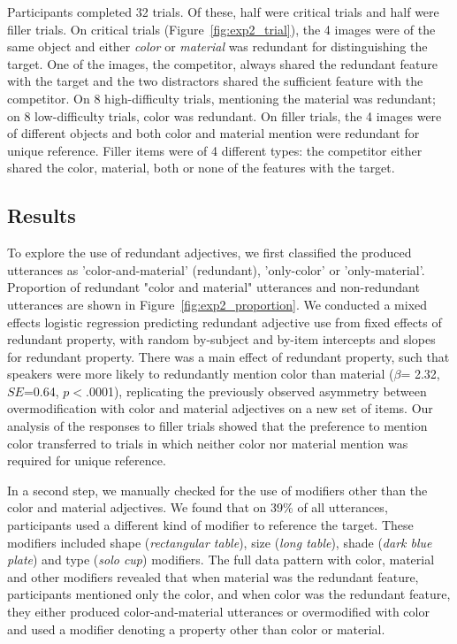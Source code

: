 \documentclass[12pt,letterpaper]{article}
\begin{document}
Participants completed 32 trials. Of these, half were critical trials and half were filler trials. On critical trials (Figure~\ref{fig:exp2_trial}), the 4 images were of the same object and either \textit{color} or \textit{material} was redundant for distinguishing the target. One of the images, the competitor, always shared the redundant feature with the target and the two distractors shared the sufficient feature with the competitor. On 8 high-difficulty trials, mentioning the material was redundant; on 8 low-difficulty trials, color was redundant. On filler trials, the 4 images were of different objects and both color and material mention were redundant for unique reference. Filler items were of 4 different types: the competitor either shared the color, material, both or none of the features with the target. 

\subsection{Results}

To explore the use of redundant adjectives, we first classified the produced utterances as 'color-and-material' (redundant), 'only-color' or 'only-material'. Proportion of redundant "color and material" utterances and non-redundant utterances are shown in Figure~\ref{fig:exp2_proportion}. We conducted a mixed effects logistic regression predicting redundant adjective use from fixed effects of redundant property, with random by-subject and by-item intercepts and slopes for redundant property. There was a main effect of redundant property, such that speakers were more likely to redundantly mention color than material ($\beta$= 2.32, $SE$=0.64, $p$$<$.0001), replicating the previously observed asymmetry between overmodification with color and material adjectives on a new set of items. Our analysis of the responses to filler trials showed that the preference to mention color transferred to trials in which neither color nor material mention was required for unique reference. 

In a second step, we manually checked for the use of modifiers other than the color and material adjectives. We found that on 39\% of all utterances, participants used a different kind of modifier to reference the target. These modifiers included shape (\textit{rectangular table}), size (\textit{long table}), shade (\textit{dark blue plate}) and type (\textit{solo cup}) modifiers. The full data pattern with color, material and other modifiers revealed that when material was the redundant feature, participants mentioned only the color, and when color was the redundant feature, they either produced color-and-material utterances or overmodified with color and used a modifier denoting a property other than color or material. 
\end{document}
